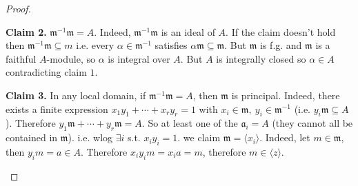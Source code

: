\documentclass[11pt,a4paper]{article}
\theoremstyle{definition}
\theoremstyle{plain}
\theoremstyle{remark}
\newcommand{\angles}[1]{\langle #1 \rangle}
\begin{document}
\begin{proof}
\begin{itemize}
        \textbf{Claim 2.} $\mathfrak{m}^{-1} \mathfrak{m} = A$. Indeed, $\mathfrak{m}^{-1} \mathfrak{m}$ is an ideal of $A$. 
        If the claim doesn't hold then $\mathfrak{m}^{-1} \mathfrak{m} \subseteq m$ i.e. every $\alpha \in \mathfrak{m}^{-1}$ satisfies $\alpha \mathfrak{m} \subseteq \mathfrak{m}$. 
        But $\mathfrak{m}$ is f.g. and $\mathfrak{m}$ is a faithful $A$-module, so $\alpha$ is integral over $A$. But $A$ is integrally closed so 
        $\alpha \in A$ contradicting claim $1$. 
        
        \textbf{Claim 3.} In any local domain, if $\mathfrak{m}^{-1} \mathfrak{m} = A$, then $\mathfrak{m}$ is principal. Indeed, 
        there exists a finite expression $x_1y_1 + \cdots + x_r y_r = 1$ with $x_i \in \mathfrak{m}, \ y_i \in \mathfrak{m}^{-1}$ (i.e. $y_i \mathfrak{m} \subseteq A$). 
        Therefore $y_1 \mathfrak{m} + \cdots + y_r \mathfrak{m} = A$. So at least one of the $\mathfrak{a}_i = A$ (they cannot all be contained in $\mathfrak{m}$). 
        i.e. wlog $\exists i$ s.t. $x_i y_i = 1$. we claim $\mathfrak{m} = \angles{x_i}$. Indeed, let $m \in \mathfrak{m}$, then $y_i m = a \in A$. 
        Therefore $x_i y_i m = x_i a = m$, therefore $m \in \angles{z}$.  
    \end{itemize}
\end{proof}
\end{document}
